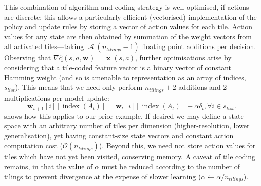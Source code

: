\documentclass[10pt, times, comsoc]{IEEEtran}
\newcommand{\acval}[3]{\ensuremath{\operatorname{\hat{q}}(#1, #2, #3)}}
\newcommand{\wvec}[1]{\ensuremath{\bm{w}_{#1}}}
\begin{document}
This combination of algorithm and coding strategy is well-optimised, if actions are discrete; this allows a particularly efficient (vectorised) implementation of the policy and update rules by storing a vector of action values for each tile.
Action values for any state are then obtained by summation of the weight vectors from all activated tiles---taking $|\mathcal{A}|(n_{\mathit{tilings}}-1)$ floating point additions per decision.
Observing that $\nabla{\acval{s}{a}{\wvec{}}} = \operatorname{\mathbf{x}}(s, a)$, further optimisations arise by considering that a tile-coded feature vector is a binary vector of constant Hamming weight (and so is amenable to representation as an array of indices, $s_{\mathit{list}}$).
This means that we need only perform $n_{\mathit{tilings}} + 2$ additions and \num{2} multiplications per model update:
\begin{equation}
\bm{w}_{t+1}[i][\operatorname{index}(A_t)] = \bm{w}_{t}[i][\operatorname{index}(A_t)] + \alpha \delta_t, \forall i \in s_{\mathit{list}}.
\label{eqn:sg-sarsa-opt}
\end{equation}
 shows how this applies to our prior example.
If desired we may define a state-space with an arbitrary number of tiles per dimension (higher-resolution, lower generalisation), yet having constant-size state vectors and constant action computation cost ($\mathcal{O}(n_{\mathit{tilings}})$).
Beyond this, we need not store action values for tiles which have not yet been visited, conserving memory.
A caveat of tile coding remains, in that the value of $\alpha$ must be reduced according to the number of tilings to prevent divergence at the expense of slower learning ($\alpha \leftarrow \alpha / n_{\mathit{tilings}}$).


\end{document}
